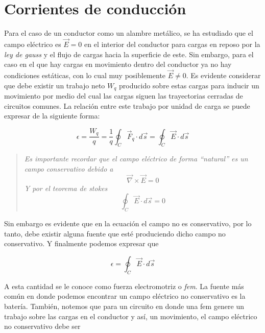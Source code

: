 \section{Corrientes de conducción}
Para el caso de un conductor como un alambre metálico, se ha estudiado que el campo eléctrico es $\vec{E} = 0$ en el interior del conductor para cargas en reposo por la \emph{ley de gauss} y el flujo de cargas hacia la superficie de este. Sin embargo, para el caso en el que hay cargas en movimiento dentro del conductor ya no hay condiciones estáticas, con lo cual muy posiblemente $\vec{E} \neq 0$. Es evidente considerar que debe existir un trabajo neto $W_q$ producido sobre estas cargas para inducir un movimiento por medio del cual las cargas siguen las trayectorias cerradas de circuitos comunes. La relación entre este trabajo por unidad de carga se puede expresar de la siguiente forma:

\begin{equation}
    \epsilon = \frac{W_q}{q} = \frac{1}{q} \oint_C \vec{F}_q \cdot d\vec{s} = \oint_C \vec{E} \cdot d\vec{s}
    \label{eq:nonconservative}
\end{equation}

\begin{quote}
    \emph{Es importante recordar que el campo eléctrico de forma ``natural'' es un campo conservativo debido a 
    \begin{equation}
        \vec{\nabla} \times \vec{E} = 0
    \end{equation}
    Y por el teorema de stokes
    \begin{equation}
        \oint_C \vec{E} \cdot d\vec{s} = 0
    \end{equation}
    }
\end{quote}

Sin embargo es evidente que en la ecuación  el campo no es conservativo, por lo tanto, debe existir alguna fuente que esté produciendo dicho campo no conservativo. Y finalmente podemos expresar que

\begin{equation}
    \epsilon = \oint_C \vec{E} \cdot d\vec{s}
\end{equation}

A esta cantidad se le conoce como fuerza electromotriz o \emph{fem}. La fuente más común en donde podemos encontrar un campo eléctrico no conservativo es la batería. También, notemos que para un circuito en donde una fem genere un trabajo sobre las cargas en el conductor y así, un movimiento, el campo eléctrico no conservativo debe ser


